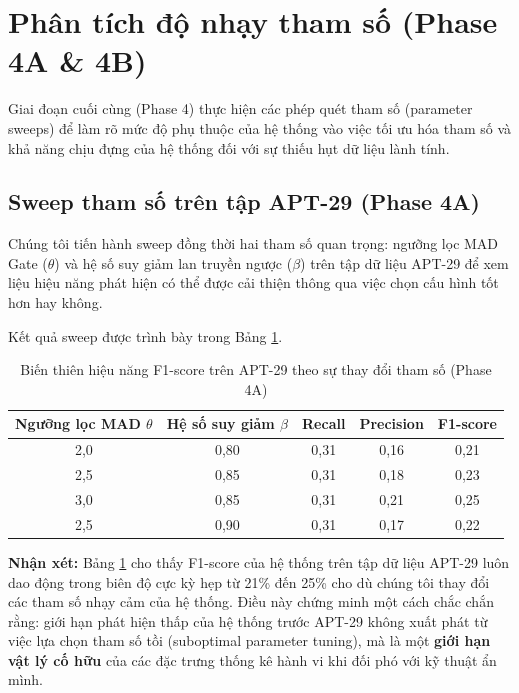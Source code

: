 \documentclass[../main.tex]{subfiles}
\begin{document}
\section{Phân tích độ nhạy tham số (Phase 4A \& 4B)}
\label{section:3.5}

Giai đoạn cuối cùng (Phase 4) thực hiện các phép quét tham số (parameter sweeps) để làm rõ mức độ phụ thuộc của hệ thống vào việc tối ưu hóa tham số và khả năng chịu đựng của hệ thống đối với sự thiếu hụt dữ liệu lành tính.

\subsection{Sweep tham số trên tập APT-29 (Phase 4A)}
Chúng tôi tiến hành sweep đồng thời hai tham số quan trọng: ngưỡng lọc MAD Gate ($\theta$) và hệ số suy giảm lan truyền ngược ($\beta$) trên tập dữ liệu APT-29 để xem liệu hiệu năng phát hiện có thể được cải thiện thông qua việc chọn cấu hình tốt hơn hay không.

Kết quả sweep được trình bày trong Bảng \ref{table:parameter_sweep_apt29}.

\begin{table}[H]
\centering
\begin{tabular}{|c|c|c|c|c|}
\hline
\textbf{Ngưỡng lọc MAD $\theta$} & \textbf{Hệ số suy giảm $\beta$} & \textbf{Recall} & \textbf{Precision} & \textbf{F1-score} \\ \hline
2,0 & 0,80 & 0,31 & 0,16 & 0,21 \\ \hline
2,5 & 0,85 & 0,31 & 0,18 & 0,23 \\ \hline
3,0 & 0,85 & 0,31 & 0,21 & 0,25 \\ \hline
2,5 & 0,90 & 0,31 & 0,17 & 0,22 \\ \hline
\end{tabular}
\caption{Biến thiên hiệu năng F1-score trên APT-29 theo sự thay đổi tham số (Phase 4A)}
\label{table:parameter_sweep_apt29}
\end{table}

\textbf{Nhận xét:}
Bảng \ref{table:parameter_sweep_apt29} cho thấy F1-score của hệ thống trên tập dữ liệu APT-29 luôn dao động trong biên độ cực kỳ hẹp từ 21\% đến 25\% cho dù chúng tôi thay đổi các tham số nhạy cảm của hệ thống. Điều này chứng minh một cách chắc chắn rằng: giới hạn phát hiện thấp của hệ thống trước APT-29 không xuất phát từ việc lựa chọn tham số tồi (suboptimal parameter tuning), mà là một \textbf{giới hạn vật lý cố hữu} của các đặc trưng thống kê hành vi khi đối phó với kỹ thuật ẩn mình.
\end{document}
